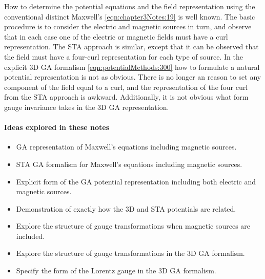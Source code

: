 How to determine the potential equations and the field representation using the conventional distinct Maxwell's \cref{eqn:chapter3Notes:19} is well known.  The basic procedure is to consider the electric and magnetic sources in turn, and observe that in each case one of the electric or magnetic fields must have a curl representation.  The STA approach is similar, except that it can be observed that the field must have a four-curl representation for each type of source.  In the explicit 3D GA formalism
\cref{eqn:potentialMethods:300} how to formulate a natural potential representation is not as obvious.  There is no longer an reason to set any component of the field equal to a curl, and the representation of the four curl from the STA approach is awkward.  Additionally, it is not obvious what form gauge invariance takes in the 3D GA representation.

\paragraph{Ideas explored in these notes}

\begin{itemize}
\item GA representation of Maxwell's equations including magnetic sources.
\item STA GA formalism for Maxwell's equations including magnetic sources.
\item Explicit form of the GA potential representation including both electric and magnetic sources.
\item Demonstration of exactly how the 3D and STA potentials are related.
\item Explore the structure of gauge transformations when magnetic sources are included.
\item Explore the structure of gauge transformations in the 3D GA formalism.
\item Specify the form of the Lorentz gauge in the 3D GA formalism.
\end{itemize}


